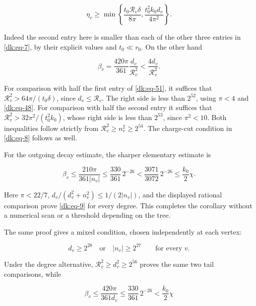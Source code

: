 \begin{equation}\label{dk:eq-51}
\eta_v\ge\min\left\{
       \frac{t_0\mathcal R_v\delta}{8\pi},
       \frac{t_0^2 k_0d_v}{4\pi^2}\right\}.
\end{equation}

Indeed the second entry here is smaller than each of the other three
entries in \eqref{dk:eq-7}, by their explicit values and \(t_0\ll r_0\).
On the other hand

\begin{equation}\label{dk:eq-52}
\beta_v=\frac{420\pi}{361}\frac{d_v}{\mathcal R_v^2}
                       <\frac{4d_v}{\mathcal R_v^2}.
\end{equation}

For comparison with half the first entry of \eqref{dk:eq-51}, it suffices that
\(\mathcal R_v^2>64\pi/(t_0\delta)\), since \(d_v\le\mathcal R_v\).
The right side is less than \(2^{52}\), using \(\pi<4\) and \eqref{dk:eq-48}.
For comparison with half the second entry it suffices that
\(\mathcal R_v^2>32\pi^2/(t_0^2k_0)\), whose right side is less
than \(2^{53}\), since \(\pi^2<10\). Both inequalities follow
strictly from \(\mathcal R_v^2\ge n_v^2\ge2^{54}\).
The charge-cut condition in \eqref{dk:eq-8} follows as well.

For the outgoing decay estimate, the sharper elementary estimate is

\begin{equation}\label{dk:eq-53}
\beta_v\le\frac{210\pi}{361|n_v|}
 \le\frac{330}{361}\,2^{-26}
 <\frac{3071}{3072}\,2^{-26}
 \le\frac{k_0}2\chi.
\end{equation}

Here \(\pi<22/7\),
\(d_v/(d_v^2+n_v^2)\le1/(2|n_v|)\), and the displayed rational
comparison prove \eqref{dk:eq-9} for every degree. This completes the corollary
without a numerical scan or a threshold depending on the tree.

The same proof gives a mixed condition, chosen independently at each
vertex:

\begin{equation}\label{dk:eq-53a}
\boxed{\qquad
       d_v\ge2^{28}\quad\text{or}\quad |n_v|\ge2^{27}
               \qquad\text{for every }v.\qquad}
\end{equation}

Under the degree alternative, \(\mathcal R_v^2\ge d_v^2\ge2^{56}\)
proves the same two tail comparisons, while

\begin{equation}\label{dk:eq-53b}
\beta_v\le\frac{420\pi}{361d_v}
             \le\frac{330}{361}\,2^{-26}
                    <\frac{k_0}2\chi
\end{equation}

